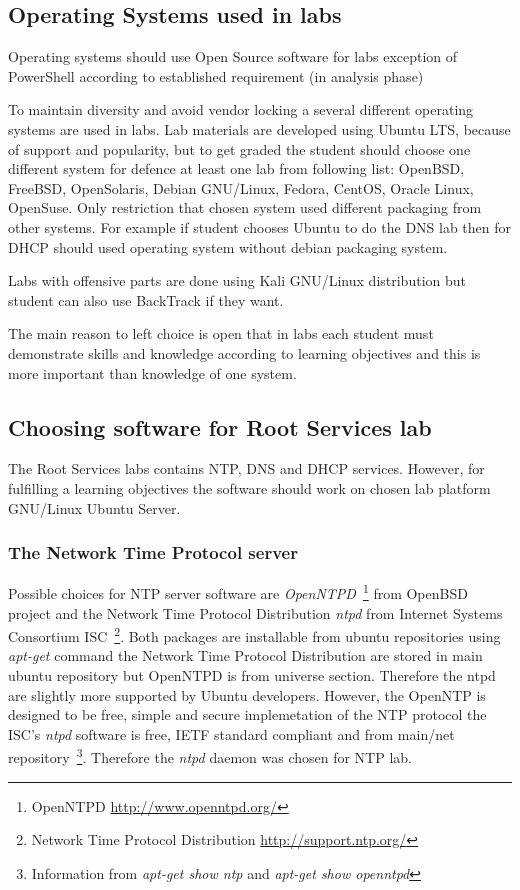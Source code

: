 \subsection{Operating Systems used in labs}
Operating systems should use Open Source software for labs exception of PowerShell according to established requirement (in analysis phase)

To maintain diversity and avoid vendor locking a several different operating systems are used in labs. Lab materials are developed using Ubuntu LTS, because of support and popularity, but to get graded the student should choose one different system for defence at least one lab from following list: OpenBSD, FreeBSD, OpenSolaris, Debian GNU/Linux, Fedora, CentOS, Oracle Linux, OpenSuse. Only restriction that chosen system used different packaging from other systems. For example if student chooses Ubuntu to do the \gls{DNS} lab then for \gls{DHCP} should used operating system without debian packaging system.

Labs with offensive parts are done using Kali GNU/Linux distribution but student can also use BackTrack if they want.

The main reason to left choice is open that in labs each student must demonstrate skills and knowledge according to learning objectives and this is more important than knowledge of one system.

\subsection{Choosing software for Root Services lab}
The Root Services labs contains \gls{NTP}, \gls{DNS} and \gls{DHCP} services. However, for fulfilling a learning objectives the software should work on chosen lab platform GNU/Linux Ubuntu Server. 
\subsubsection{The Network Time Protocol server}
Possible choices for \gls{NTP} server software are \emph{OpenNTPD}~\footnote{OpenNTPD \url{http://www.openntpd.org/}
} from OpenBSD  project and the Network Time Protocol Distribution \emph{ntpd} from  Internet Systems Consortium \gls{ISC}~\footnote{Network Time Protocol Distribution \url{http://support.ntp.org/}}. Both packages are installable from ubuntu repositories using \emph{apt-get} command the Network Time Protocol Distribution are stored in main ubuntu repository but OpenNTPD is from universe section. Therefore the \gls{ntpd} are slightly more supported by Ubuntu developers.
However, the OpenNTP is designed to be free, simple and secure implemetation of the \gls{NTP} protocol the \gls{ISC}'s \emph{ntpd} software is free, \gls{IETF} standard compliant and from main/net repository~\footnote{Information from \emph{apt-get show ntp} and \emph{apt-get show openntpd}}. Therefore the \emph{ntpd} daemon was chosen for \gls{NTP} lab.
